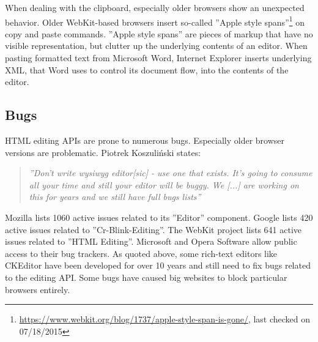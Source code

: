 When dealing with the clipboard, especially older browsers show an unexpected behavior. Older WebKit-based browsers insert so-called ''Apple style spans''\footnote{\url{https://www.webkit.org/blog/1737/apple-style-span-is-gone/}, last checked on 07/18/2015} on copy and paste commands. ''Apple style spans'' are pieces of markup that have no visible representation, but clutter up the underlying contents of an editor. When pasting formatted text from Microsoft Word, Internet Explorer inserts underlying XML, that Word uses to control its document flow, into the contents of the editor.


\subsection{Bugs} 

HTML editing APIs are prone to numerous bugs. Especially older browser versions are problematic. Piotrek Koszuli\'{n}ski states:


\begin{quotation}
\textit{''Don't write wysiwyg editor[sic] - use one that exists. It's going to consume all your time and still your editor will be buggy. We [...] are working on this for years and we still have full bugs lists\cite{sopp}''}
\end{quotation} %


\noindent Mozilla lists 1060 active issues related to its ''Editor'' component\cite{bi}. Google lists 420 active issues related to ''Cr-Blink-Editing''\cite{bh}. The WebKit project lists 641 active issues related to ''HTML Editing''\cite{bg}. Microsoft and Opera Software allow public access to their bug trackers. As quoted above, some rich-text editors like CKEditor have been developed for over 10 years and still need to fix bugs related to the editing API\cite{bf}\cite{so_paste_plain}. Some bugs have caused big websites to block particular browsers entirely\cite{medium_blocked}. %

